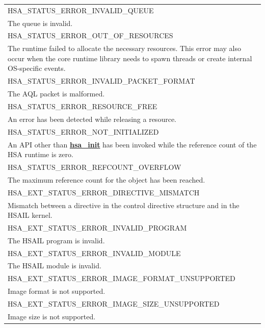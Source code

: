 \documentclass[final,oneside]{book}
\newcommand{\reffun}[1]{\textbf{#1}}
\newcommand{\reftyp}[1]{#1}
\newcommand{\refenu}[1]{\reftyp{#1}}
\begin{document}
\begin{longtable}{@{\hspace{2em}}p{\linewidth-2em}}
\hspace{-2em}\refenu{HSA_\-STATUS_\-ERROR_\-INVALID_\-QUEUE}\\The queue is invalid.\\[2mm]
\hspace{-2em}\refenu{HSA_\-STATUS_\-ERROR_\-OUT_\-OF_\-RESOURCES}\\The runtime failed to allocate the necessary resources. This error may also occur when the core runtime library needs to spawn threads or create internal OS-specific events.\\[2mm]
\hspace{-2em}\refenu{HSA_\-STATUS_\-ERROR_\-INVALID_\-PACKET_\-FORMAT}\\The AQL packet is malformed.\\[2mm]
\hspace{-2em}\refenu{HSA_\-STATUS_\-ERROR_\-RESOURCE_\-FREE}\\An error has been detected while releasing a resource.\\[2mm]
\hspace{-2em}\refenu{HSA_\-STATUS_\-ERROR_\-NOT_\-INITIALIZED}\\An API other than \hyperlink{group__initshutdown_1ga5b8574433e7dbcbd31ea397a02e3c32b}{\reffun{hsa_\-init}} has been invoked while the reference count of the HSA runtime is zero.\\[2mm]
\hspace{-2em}\refenu{HSA_\-STATUS_\-ERROR_\-REFCOUNT_\-OVERFLOW}\\The maximum reference count for the object has been reached.\\[2mm]
\hspace{-2em}\refenu{HSA_\-EXT_\-STATUS_\-ERROR_\-DIRECTIVE_\-MISMATCH}\\Mismatch between a directive in the control directive structure and in the HSAIL kernel.\\[2mm]
\hspace{-2em}\refenu{HSA_\-EXT_\-STATUS_\-ERROR_\-INVALID_\-PROGRAM}\\The HSAIL program is invalid.\\[2mm]
\hspace{-2em}\refenu{HSA_\-EXT_\-STATUS_\-ERROR_\-INVALID_\-MODULE}\\The HSAIL module is invalid.\\[2mm]
\hspace{-2em}\refenu{HSA_\-EXT_\-STATUS_\-ERROR_\-IMAGE_\-FORMAT_\-UNSUPPORTED}\\Image format is not supported.\\[2mm]
\hspace{-2em}\refenu{HSA_\-EXT_\-STATUS_\-ERROR_\-IMAGE_\-SIZE_\-UNSUPPORTED}\\Image size is not supported.
\end{longtable}
\end{document}
